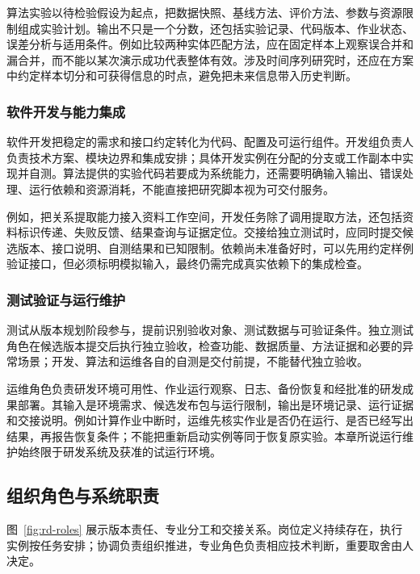 \documentclass[11pt,a4paper]{article}
\begin{document}
算法实验以待检验假设为起点，把数据快照、基线方法、评价方法、参数与资源限制组成实验计划。输出不只是一个分数，还包括实验记录、代码版本、作业状态、误差分析与适用条件。例如比较两种实体匹配方法，应在固定样本上观察误合并和漏合并，而不能以某次演示成功代表整体有效。涉及时间序列研究时，还应在方案中约定样本切分和可获得信息的时点，避免把未来信息带入历史判断。

\subsubsection{软件开发与能力集成}

软件开发把稳定的需求和接口约定转化为代码、配置及可运行组件。开发组负责人负责技术方案、模块边界和集成安排；具体开发实例在分配的分支或工作副本中实现并自测。算法提供的实验代码若要成为系统能力，还需要明确输入输出、错误处理、运行依赖和资源消耗，不能直接把研究脚本视为可交付服务。

例如，把关系提取能力接入资料工作空间，开发任务除了调用提取方法，还包括资料标识传递、失败反馈、结果查询与证据定位。交接给独立测试时，应同时提交候选版本、接口说明、自测结果和已知限制。依赖尚未准备好时，可以先用约定样例验证接口，但必须标明模拟输入，最终仍需完成真实依赖下的集成检查。

\subsubsection{测试验证与运行维护}

测试从版本规划阶段参与，提前识别验收对象、测试数据与可验证条件。独立测试角色在候选版本提交后执行独立验收，检查功能、数据质量、方法证据和必要的异常场景；开发、算法和运维各自的自测是交付前提，不能替代独立验收。

运维角色负责研发环境可用性、作业运行观察、日志、备份恢复和经批准的研发成果部署。其输入是环境需求、候选发布包与运行限制，输出是环境记录、运行证据和交接说明。例如计算作业中断时，运维先核实作业是否仍在运行、是否已经写出结果，再报告恢复条件；不能把重新启动实例等同于恢复原实验。本章所说运行维护始终限于研发系统及获准的试运行环境。

\subsection{组织角色与系统职责}

图~\ref{fig:rd-roles} 展示版本责任、专业分工和交接关系。岗位定义持续存在，执行实例按任务安排；协调负责组织推进，专业角色负责相应技术判断，重要取舍由人决定。
\end{document}
